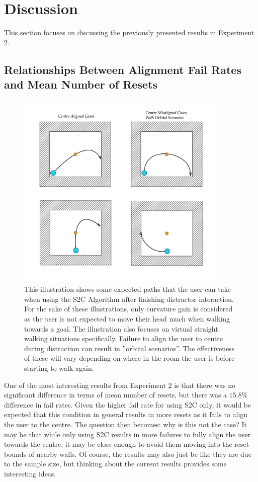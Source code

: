 \section{Discussion}
This section focuses on discussing the previously presented results in Experiment 2.

\subsection{Relationships Between Alignment Fail Rates and Mean Number of Resets}\label{sec:orbitalCases}
\begin{figure}[tbph]
    \centering
    \includegraphics[width=0.9\textwidth]{figures/graphs/orbitalcases.png}
    \caption[Various S2C Redirection Scenarios During Success/Failure of Centre Alignment]{This illustration shows some expected paths that the user can take when using the S2C Algorithm after finishing distractor interaction. For the sake of these illustrations, only curvature gain is considered as the user is not expected to move their head much when walking towards a goal. The illustration also focuses on virtual straight walking situations specifically. Failure to align the user to centre during distraction can result in ''orbital scenarios''. The effectiveness of these will vary depending on where in the room the user is before starting to walk again.}
    \label{fig:orbitalCases}
\end{figure}

One of the most interesting results from Experiment 2 is that there was no significant difference in terms of mean number of resets, but there was a $15.8\%$ difference in fail rates. Given the higher fail rate for using S2C only, it would be expected that this condition in general results in more resets as it fails to align the user to the centre. The question then becomes: why is this not the case? It may be that while only using S2C results in more failures to fully align the user towards the centre, it may be close enough to avoid them moving into the reset bounds of nearby walls. Of course, the results may also just be like they are due to the sample size, but thinking about the current results provides some interesting ideas. 

